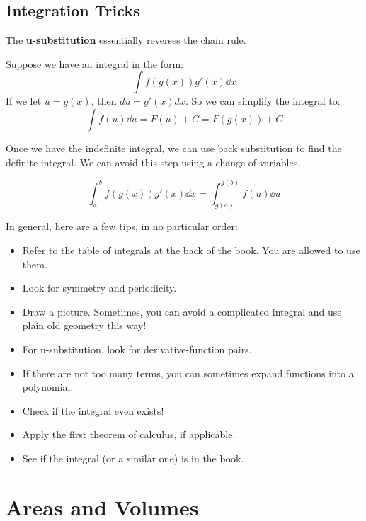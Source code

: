 \documentclass{article}
\let\oldtextbf\textbf
\renewcommand{\textbf}[1]{\oldtextbf{#1}\index{#1}}
\begin{document}
\subsection{Integration Tricks}
The \textbf{u-substitution} essentially reverses the chain rule.
\begin{idea}
    Suppose we have an integral in the form:
    \begin{equation}
        \int f(g(x))g'(x) \dd{x}
        \label{eq:}
    \end{equation}
    If we let $u=g(x)$, then $du=g'(x) dx$. So we can simplify the integral to:
    \begin{equation}
        \int f(u) \dd{u} = F(u) +C = F(g(x)) + C
        \label{eq:}
    \end{equation}      
\end{idea}
Once we have the indefinite integral, we can use back substitution to find the definite integral. We can avoid this step using a change of variables.
\begin{theorem}
    \begin{equation}
        \int_a^b f(g(x))g'(x)\dd{x} = \int_{g(a)}^{g(b)} f(u) \dd{u}
    \end{equation}
\end{theorem}
In general, here are a few tips, in no particular order:
\begin{itemize}
    \item Refer to the table of integrals at the back of the book. You are allowed to use them.
    \item Look for symmetry and periodicity.
    \item Draw a picture. Sometimes, you can avoid a complicated integral and use plain old geometry this way!
    \item For u-substitution, look for derivative-function pairs.
    \item If there are not too many terms, you can sometimes expand functions into a polynomial.
    \item Check if the integral even exists!
    \item Apply the first theorem of calculus, if applicable.
    \item See if the integral (or a similar one) is in the book.
\end{itemize}
\section{Areas and Volumes}
\end{document}
